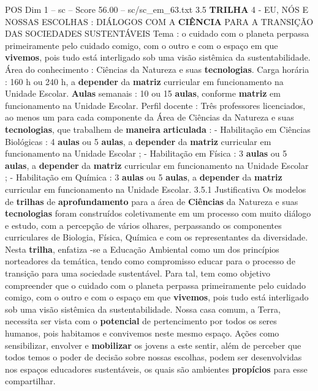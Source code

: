 \begin{textsample}{POS Dim 1 – sc – Score 56.00 – sc/sc\_em\_63.txt}  \label{ex:f1_pos_020}
3.5 \textbf{TRILHA} 4 - EU, NÓS E NOSSAS ESCOLHAS : DIÁLOGOS COM A \textbf{CIÊNCIA} PARA A TRANSIÇÃO DAS SOCIEDADES SUSTENTÁVEIS Tema : o cuidado com o planeta perpassa primeiramente pelo cuidado comigo, com o outro e com o espaço em que \textbf{vivemos}, pois tudo está interligado sob uma visão sistêmica da sustentabilidade.
Área do conhecimento : Ciências da Natureza e suas \textbf{tecnologias}.
Carga horária : 160 h ou 240 h, a \textbf{depender} da \textbf{matriz} curricular em funcionamento na Unidade Escolar. \textbf{Aulas} semanais : 10 ou 15 \textbf{aulas}, conforme \textbf{matriz} em funcionamento na Unidade Escolar.
Perfil docente : Três professores licenciados, ao menos um para cada componente da Área de Ciências da Natureza e suas \textbf{tecnologias}, que trabalhem de \textbf{maneira} \textbf{articulada} : - Habilitação em Ciências Biológicas : 4 \textbf{aulas} ou 5 \textbf{aulas}, a \textbf{depender} da \textbf{matriz} curricular em funcionamento na Unidade Escolar ; - Habilitação em Física : 3 \textbf{aulas} ou 5 \textbf{aulas}, a \textbf{depender} da \textbf{matriz} curricular em funcionamento na Unidade Escolar ; - Habilitação em Química : 3 \textbf{aulas} ou 5 \textbf{aulas}, a \textbf{depender} da \textbf{matriz} curricular em funcionamento na Unidade Escolar. 3.5.1 Justificativa Os modelos de \textbf{trilhas} de \textbf{aprofundamento} para a área de \textbf{Ciências} da Natureza e suas \textbf{tecnologias} foram construídos coletivamente em um processo com muito diálogo e estudo, com a percepção de vários olhares, perpassando os componentes curriculares de Biologia, Física, Química e com os representantes da diversidade.
Nesta \textbf{trilha}, enfatiza -se a Educação Ambiental como um dos princípios norteadores da temática, tendo como compromisso educar para o processo de transição para uma sociedade sustentável.
Para tal, tem como objetivo compreender que o cuidado com o planeta perpassa primeiramente pelo cuidado comigo, com o outro e com o espaço em que \textbf{vivemos}, pois tudo está interligado sob uma visão sistêmica da sustentabilidade.
Nossa casa comum, a Terra, necessita ser vista com o \textbf{potencial} de pertencimento por todos os seres humanos, pois habitamos e convivemos neste mesmo espaço.
Ações como sensibilizar, envolver e \textbf{mobilizar} os jovens a este sentir, além de perceber que todos temos o poder de decisão sobre nossas escolhas, podem ser desenvolvidas nos espaços educadores sustentáveis, os quais são ambientes \textbf{propícios} para esse compartilhar.

\end{textsample}
